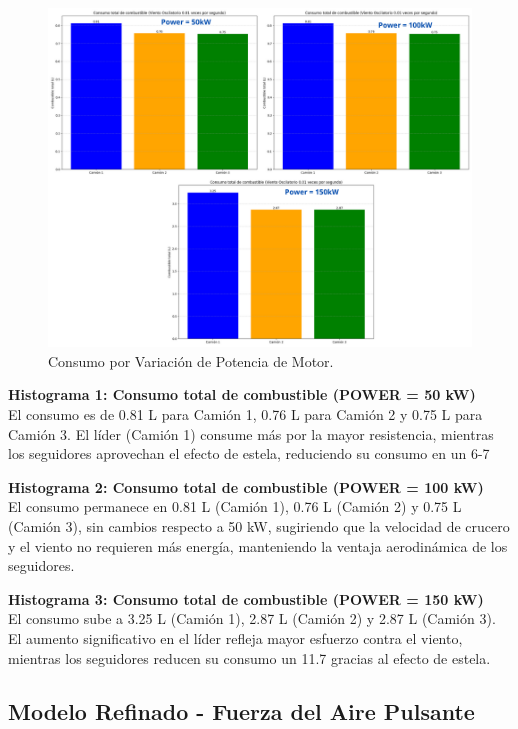 \documentclass[11pt,stdletter,orderfromtodate,sigleft,twoside]{report}
\begin{document}
\begin{enumerate}
\begin{figure}[H]
    \centering
    \includegraphics[width=0.75\linewidth]{figures//Cars/gas_power.png}
    \caption{Consumo por Variación de Potencia de Motor.}
    \label{fig:enter-label}
\end{figure}

\textbf{Histograma 1: Consumo total de combustible (POWER = 50 kW)} \\
El consumo es de 0.81 L para Camión 1, 0.76 L para Camión 2 y 0.75 L para Camión 3. El líder (Camión 1) consume más por la mayor resistencia, mientras los seguidores aprovechan el efecto de estela, reduciendo su consumo en un 6-7%

\textbf{Histograma 2: Consumo total de combustible (POWER = 100 kW)} \\
El consumo permanece en 0.81 L (Camión 1), 0.76 L (Camión 2) y 0.75 L (Camión 3), sin cambios respecto a 50 kW, sugiriendo que la velocidad de crucero y el viento no requieren más energía, manteniendo la ventaja aerodinámica de los seguidores.

\textbf{Histograma 3: Consumo total de combustible (POWER = 150 kW)} \\
El consumo sube a 3.25 L (Camión 1), 2.87 L (Camión 2) y 2.87 L (Camión 3). El aumento significativo en el líder refleja mayor esfuerzo contra el viento, mientras los seguidores reducen su consumo un 11.7 gracias al efecto de estela.
\end{enumerate}


\subsection{Modelo Refinado - Fuerza del Aire Pulsante}
\end{document}
